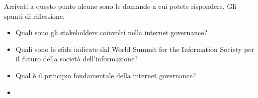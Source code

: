 Arrivati a questo punto alcune sono le domande a cui potete rispondere. Gli spunti di riflessione.
\begin{itemize}
    \item Quali sono gli stakeholders coinvolti nella internet governance?
    \item Quali sono le sfide indicate dal World Summit for the Information Society per il futuro della società dell'informazione?
    \item Qual è il principio fondamentale della internet governance?
    \item
\end{itemize}
